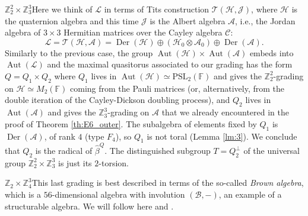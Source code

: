 \documentclass[a4paper,reqno]{amsart}
\theoremstyle{definition}
\numberwithin{theorem}{section}
\numberwithin{equation}{section}
\begin{document}
$\boxed{{\mathbb{Z}}_2^2\times{\mathbb{Z}}_3^3}$\quad Here we think of ${\mathcal{L}}$ in terms of Tits construction ${\mathcal{T}}({\mathcal{H}},{\mathcal{J}})$, where ${\mathcal{H}}$ is the quaternion algebra and this time ${\mathcal{J}}$ is the Albert algebra ${\mathcal{A}}$, i.e., the Jordan algebra of $3\times 3$ Hermitian matrices over the Cayley algebra ${\mathcal{C}}$:
\[
{\mathcal{L}}={\mathcal{T}}({\mathcal{H}},{\mathcal{A}})=\operatorname{\mathrm{Der}}({\mathcal{H}})\oplus({\mathcal{H}}_0\otimes{\mathcal{A}}_0)\oplus\operatorname{\mathrm{Der}}({\mathcal{A}}).
\]
Similarly to the previous case, the group $\operatorname{\mathrm{Aut}}({\mathcal{H}})\times\operatorname{\mathrm{Aut}}({\mathcal{A}})$ embeds into $\operatorname{\mathrm{Aut}}({\mathcal{L}})$ and the maximal quasitorus associated to our grading has the form $Q=Q_1\times Q_2$ where $Q_1$ lives in $\operatorname{\mathrm{Aut}}({\mathcal{H}})\simeq{\mathrm{PSL}}_2({\mathbb{F}})$ and gives the ${\mathbb{Z}}_2^2$-grading on ${\mathcal{H}}\simeq M_2({\mathbb{F}})$ coming from the Pauli matrices (or, alternatively, from the double iteration of the Cayley-Dickson doubling process), and $Q_2$ lives in $\operatorname{\mathrm{Aut}}({\mathcal{A}})$ and gives the ${\mathbb{Z}}_3^3$-grading on ${\mathcal{A}}$ that we already encountered in the proof of Theorem \ref{th:E6_outer}. The subalgebra of elements fixed by $Q_1$ is $\operatorname{\mathrm{Der}}({\mathcal{A}})$, of rank $4$ (type $F_4$), so $Q_1$ is not toral (Lemma \ref{lm:3}). We conclude that $Q_2$ is the radical of $\hat\beta^Q$. The distinguished subgroup $T=Q_2^\perp$ of the universal group ${\mathbb{Z}}_2^2\times{\mathbb{Z}}_3^3$ is just its $2$-torsion.

\medskip

$\boxed{{\mathbb{Z}}_2\times{\mathbb{Z}}_4^3}$\quad This last grading is best described in terms of the so-called \emph{Brown algebra}, which is a $56$-dimensional algebra with involution $({\mathcal{B}},-)$, an example of a structurable algebra. We will follow here \cite{AEK} and \cite{Garibaldi}.
\end{document}
